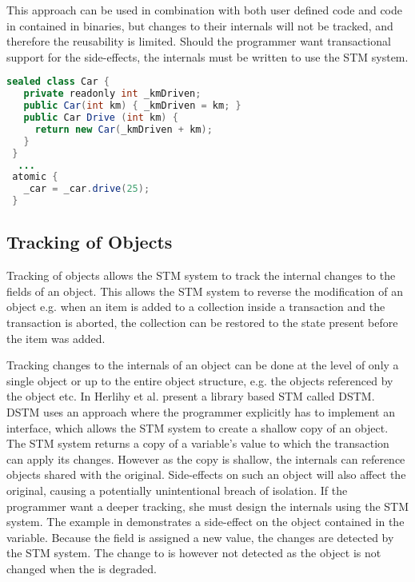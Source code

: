 This approach can be used in combination with both user defined code and code in contained in binaries, but changes to their internals will not be tracked, and therefore the reusability is limited. Should the programmer want transactional support for the side-effects, the internals must be written to use the \ac{STM} system.

%
\begin{lstlisting}[label=lst:tracking_variable,
 float,
 caption={Tracking Assignment to Variables},
 language=Java, 
 showspaces=false,
 showtabs=false,
 breaklines=true,
 showstringspaces=false,
 breakatwhitespace=true,
 commentstyle=\color{greencomments},
 keywordstyle=\color{bluekeywords},
 stringstyle=\color{redstrings},
 morekeywords={atomic, retry, orElse, var, get, set, sealed}]  % Start your code-block
  sealed class Car {
   private readonly int _kmDriven;
   public Car(int km) { _kmDriven = km; }
   public Car Drive (int km) {
     return new Car(_kmDriven + km);
   }
 }
  ...
 atomic {
   _car = _car.drive(25);
 }
\end{lstlisting}
%
\subsection{Tracking of Objects}
Tracking of objects allows the \ac{STM} system to track the internal changes to the fields of an object. This allows the \ac{STM} system to reverse the modification of an object e.g. when an item is added to a collection inside a transaction and the transaction is aborted, the collection can be restored to the state present before the item was added.

Tracking changes to the internals of an object can be done at the level of only a single object or up to the entire object structure, e.g. the objects referenced by the object etc. In \cite{herlihy2003software} Herlihy et al. present a library based \ac{STM} called \ac{DSTM}. \ac{DSTM} uses an approach where the programmer explicitly has to implement an interface, which allows the \ac{STM} system to create a shallow copy of an object. The \ac{STM} system returns a copy of a variable's value to which the transaction can apply its changes. However as the copy is shallow, the internals can reference objects shared with the original. Side-effects on such an object will also affect the original, causing a potentially unintentional breach of isolation. If the programmer want a deeper tracking, she must design the internals using the \ac{STM} system. The example in  demonstrates a side-effect on the object contained in the  variable.  Because the  field is assigned a new value, the changes are detected by the \ac{STM} system. The change to  is however not detected as the  object is not changed when the  is degraded.

